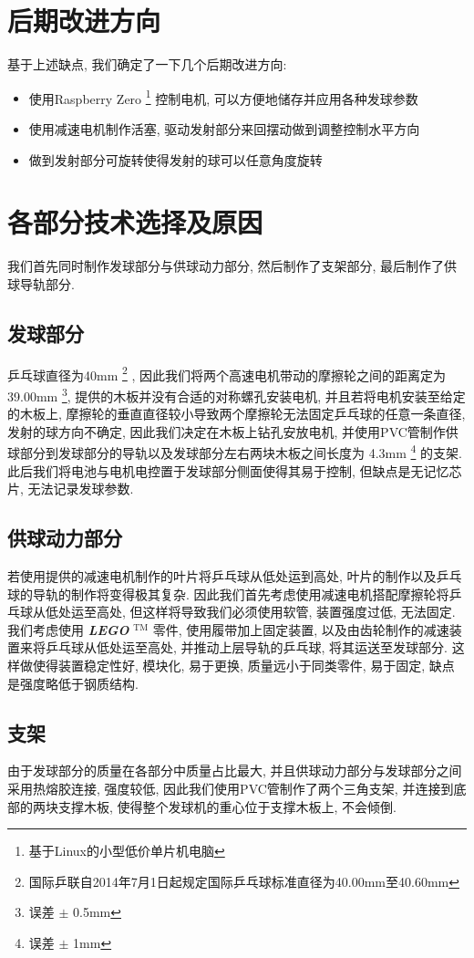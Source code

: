\documentclass[UTF8]{ctexart}
\begin{document}
\section{\Large 后期改进方向}
\noindent 基于上述缺点, 我们确定了一下几个后期改进方向:
\begin{itemize}
	\item 使用Raspberry Zero \footnote {基于Linux的小型低价单片机电脑} 控制电机, 可以方便地储存并应用各种发球参数
	\item 使用减速电机制作活塞, 驱动发射部分来回摆动做到调整控制水平方向
	\item 做到发射部分可旋转使得发射的球可以任意角度旋转
\end{itemize}
\section{\Large 各部分技术选择及原因}
我们首先同时制作发球部分与供球动力部分, 然后制作了支架部分, 最后制作了供球导轨部分.
\subsection{\large 发球部分}
乒乓球直径为40mm \footnote{国际乒联自2014年7月1日起规定国际乒乓球标准直径为40.00mm至40.60mm} , 因此我们将两个高速电机带动的摩擦轮之间的距离定为39.00mm \footnote{误差 $ \pm $ 0.5mm}, 提供的木板并没有合适的对称螺孔安装电机, 并且若将电机安装至给定的木板上, 摩擦轮的垂直直径较小导致两个摩擦轮无法固定乒乓球的任意一条直径, 发射的球方向不确定, 因此我们决定在木板上钻孔安放电机, 并使用PVC管制作供球部分到发球部分的导轨以及发球部分左右两块木板之间长度为 4.3mm \footnote{误差 $ \pm $ 1mm} 的支架. 此后我们将电池与电机电控置于发球部分侧面使得其易于控制, 但缺点是无记忆芯片, 无法记录发球参数.
\subsection{\large 供球动力部分}
若使用提供的减速电机制作的叶片将乒乓球从低处运到高处, 叶片的制作以及乒乓球的导轨的制作将变得极其复杂. 因此我们首先考虑使用减速电机搭配摩擦轮将乒乓球从低处运至高处, 但这样将导致我们必须使用软管, 装置强度过低, 无法固定. 我们考虑使用 \textit{\textbf{LEGO}} $ ^\text{TM} $ 零件, 使用履带加上固定装置, 以及由齿轮制作的减速装置来将乒乓球从低处运至高处, 并推动上层导轨的乒乓球, 将其运送至发球部分. 这样做使得装置稳定性好, 模块化, 易于更换, 质量远小于同类零件, 易于固定, 缺点是强度略低于钢质结构.
\subsection{\large 支架}
由于发球部分的质量在各部分中质量占比最大, 并且供球动力部分与发球部分之间采用热熔胶连接, 强度较低, 因此我们使用PVC管制作了两个三角支架, 并连接到底部的两块支撑木板, 使得整个发球机的重心位于支撑木板上, 不会倾倒.
\end{document}
